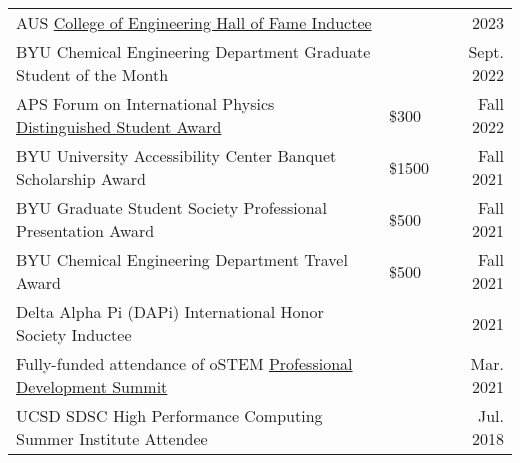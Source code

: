 \documentclass[letterpaper,11pt]{article}
\begin{document}
\begin{longtable}{@{}p{} p{} r@{}}
  AUS \href{https://www.aus.edu/cen/alumni-hall-of-fame#:~:text=of\%20Technology\%20Sydney-,Dr.\%20Pierre\%20Kawak\%C2\%A0,-BS\%27\%2015\%20\%2D\%20Chemical}{College of Engineering Hall of Fame Inductee}                           &         & 2023         \\[3pt]
  BYU Chemical Engineering Department Graduate Student of the Month                                                                                                                                                                   &         & Sept. 2022   \\[3pt]
  APS Forum on International Physics \href{https://engage.aps.org/fip/honors/prizes-awards/ds-program}{Distinguished Student Award}                                                                                                   & \$300   & Fall 2022    \\[3pt] %
  BYU University Accessibility Center Banquet Scholarship Award                                                                                                                                                                       & \$1500  & Fall 2021    \\[3pt] %
  BYU Graduate Student Society Professional Presentation Award                                                                                                                                                                        & \$500   & Fall 2021    \\[3pt] %
  BYU Chemical Engineering Department Travel Award                                                                                                                                                                                    & \$500   & Fall 2021    \\[3pt] %
  Delta Alpha Pi (DAPi) International Honor Society Inductee                                                                                                                                                                          &         & 2021         \\[3pt]
  Fully-funded attendance of oSTEM \href{https://ostem.org/page/professional-development-summit}{Professional Development Summit}                                                                                                     &         & Mar. 2021    \\[3pt]
  UCSD SDSC High Performance Computing Summer Institute Attendee                                                                                                                                                                      &         & Jul. 2018    \\[3pt]

\end{longtable}
\end{document}
